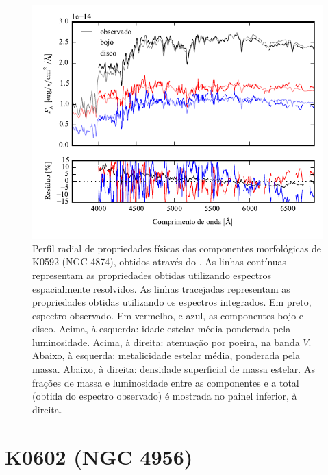 \begin{figure}
	\includegraphics[page=6]{figuras/sample006a_synthesis}
	\caption[Propriedades físicas das componentes morfológicas de K0592 (NGC 4874)]
	{Perfil radial de propriedades físicas das componentes morfológicas de
	K0592 (NGC 4874), obtidos através do \starlight. As linhas contínuas
	representam as propriedades obtidas utilizando espectros espacialmente
	resolvidos. As linhas tracejadas representam as propriedades obtidas utilizando
	os espectros integrados. Em preto, espectro observado. Em vermelho, e azul, as
	componentes bojo e disco. Acima, à esquerda: idade estelar média ponderada pela
	luminosidade. Acima, à direita: atenuação por poeira, na banda $V$. Abaixo, à
	esquerda: metalicidade estelar média, ponderada pela massa. Abaixo, à direita:
	densidade superficial de massa estelar. As frações de massa e luminosidade
	entre as componentes e a total (obtida do espectro observado) é mostrada no
	painel inferior, à direita.}
	\label{fig:decompSinteseRadprof:K0592}
\end{figure}

\FloatBarrier


\section{K0602 (NGC 4956)}
\label{apendice:Decomp:K0602}

